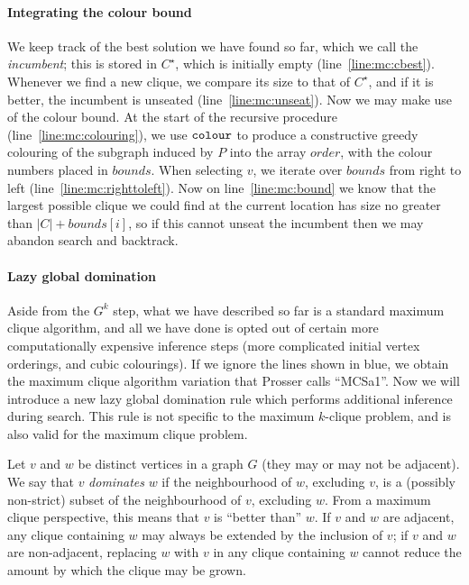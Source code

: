 \documentclass[letterpaper]{article}
\newcommand{\mcline}[1]{line~\ref{line:mc:#1}}
\newcommand{\Cbest}{C^\star}
\newcommand{\bounds}{\mathit{bounds}}
\newcommand{\order}{\mathit{order}}
\newcommand{\colourOrder}{\FuncSty{colour}}
\begin{document}
\paragraph{Integrating the colour bound}

We keep track of the best solution we have found so far, which we call the \emph{incumbent}; this is
stored in $\Cbest$, which is initially empty (\mcline{cbest}). Whenever we find a new clique, we
compare its size to that of $\Cbest$, and if it is better, the incumbent is unseated
(\mcline{unseat}). Now we may make use of the colour bound. At the start of the recursive procedure
(\mcline{colouring}), we use $\colourOrder$ to produce a constructive greedy colouring of the
subgraph induced by $P$ into the array $\order$, with the colour numbers placed in $\bounds$. When
selecting $v$, we iterate over $\bounds$ from right to left (\mcline{righttoleft}). Now on
\mcline{bound} we know that the largest possible clique we could find at the current location has
size no greater than $|C| + \bounds[i]$, so if this cannot unseat the incumbent then we may abandon
search and backtrack.

\paragraph{Lazy global domination}

Aside from the $G^k$ step, what we have described so far is a standard maximum clique algorithm, and
all we have done is opted out of certain more computationally expensive inference steps (more
complicated initial vertex orderings, and cubic colourings). If we ignore the lines shown in blue,
we obtain the maximum clique algorithm variation that Prosser \cite{Prosser:2012} calls ``MCSa1''.
Now we will introduce a new lazy global domination rule which performs additional inference during
search. This rule is not specific to the maximum $k$-clique problem, and is also valid for the
maximum clique problem.

Let $v$ and $w$ be distinct vertices in a graph $G$ (they may or may not be adjacent). We say that
$v$ \emph{dominates} $w$ if the neighbourhood of $w$, excluding $v$, is a (possibly non-strict)
subset of the neighbourhood of $v$, excluding $w$. From a maximum clique perspective, this means
that $v$ is ``better than'' $w$. If $v$ and $w$ are adjacent, any clique containing $w$ may always
be extended by the inclusion of $v$; if $v$ and $w$ are non-adjacent, replacing $w$ with $v$ in any
clique containing $w$ cannot reduce the amount by which the clique may be grown.
\end{document}
